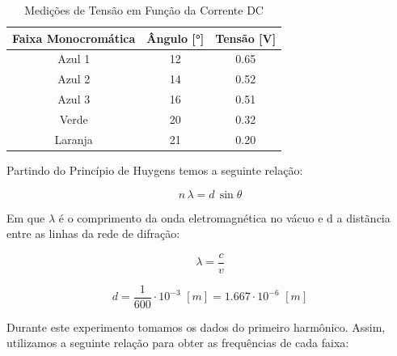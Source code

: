 \documentclass[10pt,twocolumn,letterpaper]{article}
\begin{document}
\begin{table}[htbp]
    \centering
    \caption{Medições de Tensão em Função da Corrente DC}
    \label{tab:medicoes_tensao}
    \vspace{0.25cm}
    \begin{tabular}{ccc}
        \hline
        \rule{0pt}{3ex}\textbf{Faixa Monocromática} & \textbf{Ângulo} [°] & \textbf{Tensão} [V]\\[5pt]
        \hline
        \rule{0pt}{3ex}Azul 1 & 12 & 0.65 \\
        Azul 2 & 14 & 0.52 \\
        Azul 3 & 16 & 0.51 \\
        Verde & 20 & 0.32 \\
        Laranja & 21 & 0.20 \\[5pt]
        \hline
    \end{tabular}
\end{table}

\vspace{-.25cm}

\noindent Partindo do Princípio de Huygens temos a seguinte relação:

\vspace{-.5cm}

\begin{equation*}
    n\,\lambda = d\, \sin{\theta}
\end{equation*}

\vspace{-.15cm}

\hspace{1cm} Em que $\lambda$ é o comprimento da onda eletromagnética no vácuo e d a distãncia entre as linhas da rede de difração:

\vspace{-.5cm}

\begin{equation*}
    \lambda = \frac{c}{v}
\end{equation*}

\vspace{-.4cm}

\begin{equation*}
    d = \frac{1}{600}\cdot10^{-3}\,\,[m] = 1.667 \cdot 10^{-6} \,\, [m]
\end{equation*}

\vspace{-.1cm}

\hspace{1cm} Durante este experimento tomamos os dados do primeiro harmônico. Assim, utilizamos a seguinte relação para obter as frequências de cada faixa:
\end{document}

